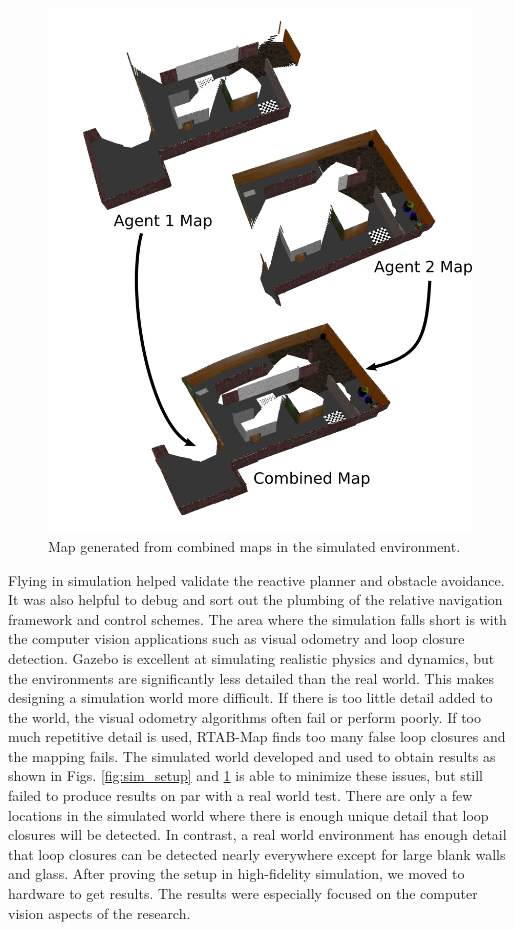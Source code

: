 \documentclass[letterpaper, 10 pt, conference]{ieeeconf}  %
\begin{document}
\begin{figure}
\centering
\includegraphics[width=1.0\linewidth]{sim_map}
\caption{Map generated from combined maps in the simulated environment.}
\label{fig:sim_map}
\end{figure}

Flying in simulation helped validate the reactive planner and obstacle avoidance. It was also helpful to debug and sort out the plumbing of the relative navigation framework and control schemes. The area where the simulation falls short is with the computer vision applications such as visual odometry and loop closure detection. Gazebo is excellent at simulating realistic physics and dynamics, but the environments are significantly less detailed than the real world. This makes designing a simulation world more difficult. If there is too little detail added to the world, the visual odometry algorithms often fail or perform poorly. If too much repetitive detail is used, RTAB-Map finds too many false loop closures and the mapping fails. The simulated world developed and used to obtain results as shown in Figs. \ref{fig:sim_setup} and \ref{fig:sim_map} is able to minimize these issues, but still failed to produce results on par with a real world test. There are only a few locations in the simulated world where there is enough unique detail that loop closures will be detected. In contrast, a real world environment has enough detail that loop closures can be detected nearly everywhere except for large blank walls and glass. After proving the setup in high-fidelity simulation, we moved to hardware to get results. The results were especially focused on the computer vision aspects of the research.
\end{document}
